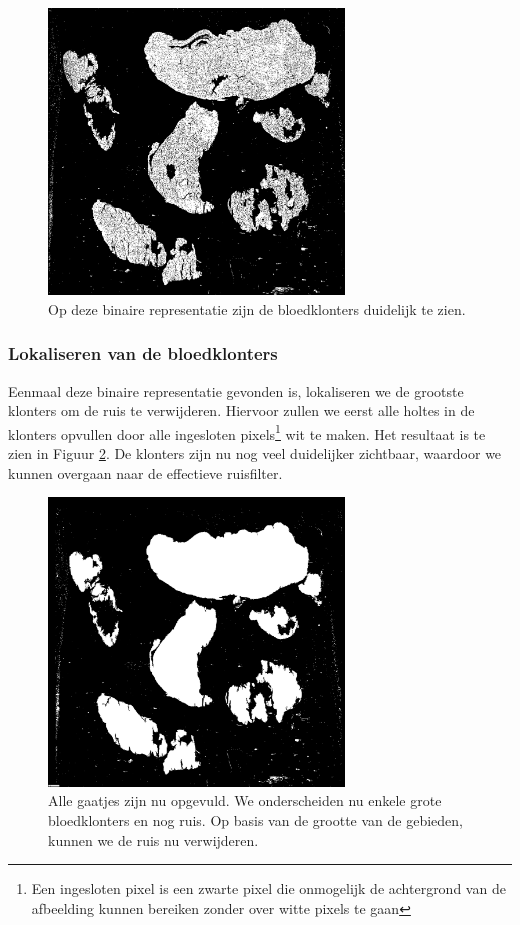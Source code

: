 \documentclass[a4paper,kulak]{kulakarticle}
\begin{document}
	\begin{figure}[h!]
		\centering
		\includegraphics[width=0.7\textwidth]{grijswaarden_bin_vb}
		\caption{Op deze binaire representatie zijn de bloedklonters duidelijk te zien.}
		\label{figuur foto_bin}
	\end{figure}
	
	\subsubsection{Lokaliseren van de bloedklonters}
		Eenmaal deze binaire representatie gevonden is, lokaliseren we de grootste klonters om de ruis te verwijderen. Hiervoor zullen we eerst alle holtes in de klonters opvullen door alle ingesloten pixels\footnote{Een ingesloten pixel is een zwarte pixel die onmogelijk de achtergrond van de afbeelding kunnen bereiken zonder over witte pixels te gaan} wit te maken. Het resultaat is te zien in Figuur \ref{figuur lok_bloed}. De klonters zijn nu nog veel duidelijker zichtbaar, waardoor we kunnen overgaan naar de effectieve ruisfilter.

	\begin{figure}[h]
		\centering
		\includegraphics[width = 0.7\textwidth]{grijswaarden_bin_gevuld_vb}
		\caption{Alle gaatjes zijn nu opgevuld. We onderscheiden nu enkele grote bloedklonters en nog ruis. Op basis van de grootte van de gebieden, kunnen we de ruis nu verwijderen.}
		\label{figuur lok_bloed}
	\end{figure}
\end{document}
